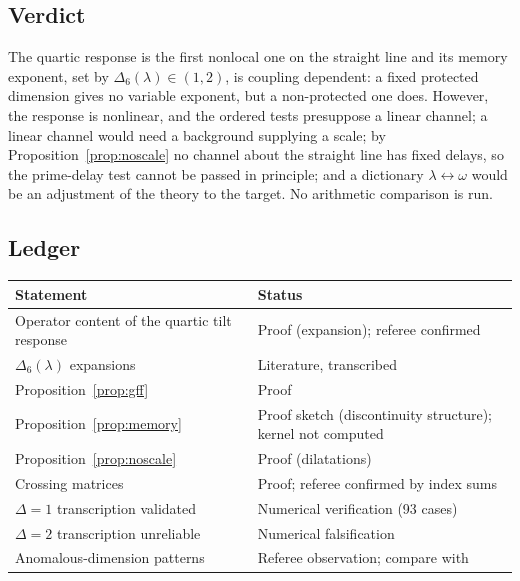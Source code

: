 \subsection{Verdict}

The quartic response is the first nonlocal one on the straight line and its memory exponent, set by
$\Delta_6(\lambda)\in(1,2)$, is coupling dependent: a fixed protected dimension gives no variable exponent, but a
non-protected one does. However, the response is nonlinear, and the ordered tests presuppose a linear channel; a linear
channel would need a background supplying a scale; by Proposition~\ref{prop:noscale} no channel about the straight line
has fixed delays, so the prime-delay test cannot be passed in principle; and a dictionary $\lambda\leftrightarrow\omega$
would be an adjustment of the theory to the target. No arithmetic comparison is run.

\subsection*{Ledger}
\begin{center}\small
\begin{tabular}{@{}p{}p{}@{}}
\toprule
Statement & Status\\
\midrule
Operator content of the quartic tilt response & Proof (expansion); referee confirmed\\
$\Delta_6(\lambda)$ expansions & Literature, transcribed\\
Proposition~\ref{prop:gff} & Proof\\
Proposition~\ref{prop:memory} & Proof sketch (discontinuity structure); kernel not computed\\
Proposition~\ref{prop:noscale} & Proof (dilatations)\\
Crossing matrices & Proof; referee confirmed by index sums\\
$\Delta=1$ transcription validated & Numerical verification (93 cases)\\
$\Delta=2$ transcription unreliable & Numerical falsification\\
Anomalous-dimension patterns & Referee observation; compare with \cite{GRT}\\
\bottomrule
\end{tabular}
\end{center}
